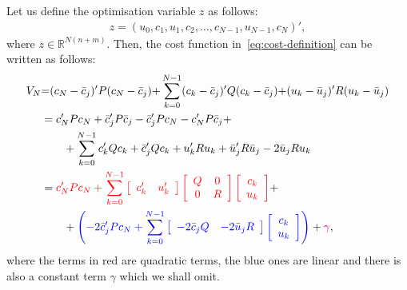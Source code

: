 \documentclass[12pt]{report}
\renewcommand{\Re}{\mathbb{R}}
\newcommand{\bcj}{\bar{c}_j}
\newcommand{\buj}{\bar{u}_j}
\begin{document}
Let us define the optimisation variable $z$ as follows:
\begin{align}
z=\left( u_0, c_1, u_1, c_2, \ldots, c_{N-1}, u_{N-1}, c_{N}\right)',
\end{align}
where $z\in\Re^{N(n+m)}$. Then, the cost function in~\eqref{eq:cost-definition}
can be written as follows:
\begin{align*}
V_N &{=} (c_N-\bcj)'P(c_N-\bcj) {+} \sum_{k=0}^{N-1}(c_k-\bcj)'Q(c_k-\bcj){+} 
		(u_k-\buj)'R(u_k-\buj)\\
		&= c_N' P c_N + \bcj' P \bcj - \bcj' P c_N - c_N' P \bcj +\\
		  &\qquad + \sum_{k=0}^{N-1} c_k' Q c_k + \bcj' Q c_k + u_k' R u_k + \buj' R \buj - 2\buj R u_k\\
		&=\textcolor{red}{c_N' P c_N + \sum_{k=0}^{N-1} \left[ \begin{array}{cc}c_k' & u_k'\end{array}\right]
\left[ \begin{array}{cc}
Q & 0\\0 & R
\end{array}\right]
\left[ \begin{array}{c}
c_k\\
u_k
\end{array}\right]}+\\
&\qquad+\textcolor{blue}{\left( 
-2\bcj' P c_N + 
\sum_{k=0}^{N-1}\left[ \begin{array}{cc}
-2\bcj Q & -2\buj R
\end{array}\right]\left[ 
\begin{array}{c}
c_k\\u_k
\end{array}\right]
\right)}+\textcolor{magenta}{\gamma},
\end{align*}
where the terms in red are quadratic terms, the blue ones are linear and
there is also a constant term $\gamma$ which we shall omit.
\end{document}

